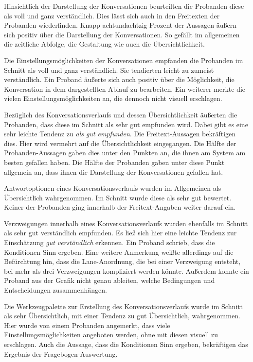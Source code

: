 Hinsichtlich der Darstellung der Konversationen beurteilten die Probanden diese als voll und ganz verständlich. Dies lässt sich auch in den Freitexten der Probanden wiederfinden. Knapp achtundachtzig Prozent der Aussagen äußern sich positiv über die Darstellung der Konversationen. So gefällt im allgemeinen die zeitliche Abfolge, die Gestaltung wie auch die Übersichtlichkeit. 

Die Einstellungsmöglichkeiten der Konversationen empfanden die Probanden im Schnitt als voll und ganz verständlich. Sie tendierten leicht zu zumeist verständlich. Ein Proband äußerte sich auch positiv über die Möglichkeit, die Konversation in dem dargestellten Ablauf zu bearbeiten. Ein weiterer merkte die vielen Einstellungsmöglichkeiten an, die dennoch nicht visuell erschlagen.

Bezüglich des Konversationsverlaufs und dessen Übersichtlichkeit äußerten die Probanden, dass diese im Schnitt als sehr gut empfunden wird. Dabei gibt es eine sehr leichte Tendenz zu \emph{als gut empfunden}. Die Freitext-Aussagen bekräftigen dies. Hier wird vermehrt auf die Übersichtlichkeit eingegangen. Die Hälfte der Probanden-Aussagen gaben dies unter den Punkten an, die ihnen am System am besten gefallen haben. Die Hälfte der Probanden gaben unter diese Punkt allgemein an, dass ihnen die Darstellung der Konversationen gefallen hat.

Antwortoptionen eines Konversationsverlaufs wurden im Allgemeinen als Übersichtlich wahrgenommen. Im Schnitt wurde diese als sehr gut bewertet. Keiner der Probanden ging innerhalb der Freitext-Angaben weiter darauf ein.

Verzweigungen innerhalb eines Konversationsverlaufs wurden ebenfalls im Schnitt als sehr gut verständlich empfunden. Es ließ sich hier eine leichte Tendenz zur Einschätzung \emph{gut verständlich} erkennen. Ein Proband schrieb, dass die Konditionen Sinn ergeben. Eine weitere Anmerkung weißte allerdings auf die Befürchtung hin, dass die Lane-Anordnung, die bei einer Verzweigung entsteht, bei mehr als drei Verzweigungen kompliziert werden könnte. Außerdem konnte ein Proband aus der Grafik nicht genau ableiten, welche Bedingungen und Entscheidungen zusammenhängen. 

Die Werkzeugpalette zur Erstellung des Konversationsverlaufs wurde im Schnitt als sehr Übersichtlich, mit einer Tendenz zu gut Übersichtlich, wahrgenommen. Hier wurde von einem Probanden angemerkt, dass viele Einstellungsmöglichkeiten angeboten werden, ohne mit diesen visuell zu erschlagen. Auch die Aussage, dass die Konditionen Sinn ergeben, bekräftigen das Ergebnis der Fragebogen-Auswertung.

